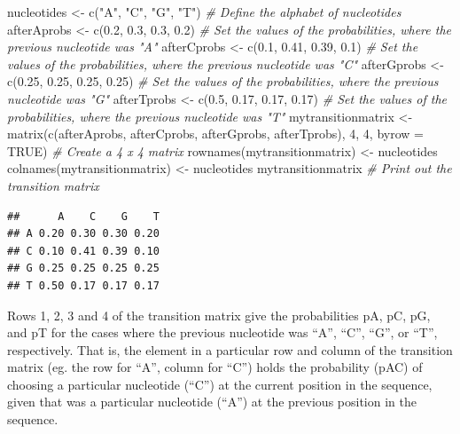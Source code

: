 \documentclass[
]{book}
\newenvironment{Shaded}{\begin{snugshade}}{\end{snugshade}}
\newcommand{\AttributeTok}[1]{\textcolor[rgb]{0.77,0.63,0.00}{#1}}
\newcommand{\CommentTok}[1]{\textcolor[rgb]{0.56,0.35,0.01}{\textit{#1}}}
\newcommand{\ConstantTok}[1]{\textcolor[rgb]{0.00,0.00,0.00}{#1}}
\newcommand{\DecValTok}[1]{\textcolor[rgb]{0.00,0.00,0.81}{#1}}
\newcommand{\FloatTok}[1]{\textcolor[rgb]{0.00,0.00,0.81}{#1}}
\newcommand{\FunctionTok}[1]{\textcolor[rgb]{0.00,0.00,0.00}{#1}}
\newcommand{\NormalTok}[1]{#1}
\newcommand{\OtherTok}[1]{\textcolor[rgb]{0.56,0.35,0.01}{#1}}
\newcommand{\StringTok}[1]{\textcolor[rgb]{0.31,0.60,0.02}{#1}}
\begin{document}
\begin{Shaded}
\begin{Highlighting}[]
\NormalTok{nucleotides         }\OtherTok{\textless{}{-}} \FunctionTok{c}\NormalTok{(}\StringTok{"A"}\NormalTok{, }\StringTok{"C"}\NormalTok{, }\StringTok{"G"}\NormalTok{, }\StringTok{"T"}\NormalTok{) }\CommentTok{\# Define the alphabet of nucleotides}
\NormalTok{afterAprobs }\OtherTok{\textless{}{-}} \FunctionTok{c}\NormalTok{(}\FloatTok{0.2}\NormalTok{, }\FloatTok{0.3}\NormalTok{, }\FloatTok{0.3}\NormalTok{, }\FloatTok{0.2}\NormalTok{)         }\CommentTok{\# Set the values of the probabilities, where the previous nucleotide was "A"}
\NormalTok{afterCprobs }\OtherTok{\textless{}{-}} \FunctionTok{c}\NormalTok{(}\FloatTok{0.1}\NormalTok{, }\FloatTok{0.41}\NormalTok{, }\FloatTok{0.39}\NormalTok{, }\FloatTok{0.1}\NormalTok{)       }\CommentTok{\# Set the values of the probabilities, where the previous nucleotide was "C"}
\NormalTok{afterGprobs }\OtherTok{\textless{}{-}} \FunctionTok{c}\NormalTok{(}\FloatTok{0.25}\NormalTok{, }\FloatTok{0.25}\NormalTok{, }\FloatTok{0.25}\NormalTok{, }\FloatTok{0.25}\NormalTok{)     }\CommentTok{\# Set the values of the probabilities, where the previous nucleotide was "G"}
\NormalTok{afterTprobs }\OtherTok{\textless{}{-}} \FunctionTok{c}\NormalTok{(}\FloatTok{0.5}\NormalTok{, }\FloatTok{0.17}\NormalTok{, }\FloatTok{0.17}\NormalTok{, }\FloatTok{0.17}\NormalTok{)      }\CommentTok{\# Set the values of the probabilities, where the previous nucleotide was "T"}
\NormalTok{mytransitionmatrix }\OtherTok{\textless{}{-}} \FunctionTok{matrix}\NormalTok{(}\FunctionTok{c}\NormalTok{(afterAprobs, afterCprobs, afterGprobs, afterTprobs), }\DecValTok{4}\NormalTok{, }\DecValTok{4}\NormalTok{, }\AttributeTok{byrow =} \ConstantTok{TRUE}\NormalTok{) }\CommentTok{\# Create a 4 x 4 matrix}
\FunctionTok{rownames}\NormalTok{(mytransitionmatrix) }\OtherTok{\textless{}{-}}\NormalTok{ nucleotides}
\FunctionTok{colnames}\NormalTok{(mytransitionmatrix) }\OtherTok{\textless{}{-}}\NormalTok{ nucleotides}
\NormalTok{mytransitionmatrix                           }\CommentTok{\# Print out the transition matrix}
\end{Highlighting}
\end{Shaded}

\begin{verbatim}
##      A    C    G    T
## A 0.20 0.30 0.30 0.20
## C 0.10 0.41 0.39 0.10
## G 0.25 0.25 0.25 0.25
## T 0.50 0.17 0.17 0.17
\end{verbatim}

Rows 1, 2, 3 and 4 of the transition matrix give the probabilities pA, pC, pG, and pT for the cases where the previous nucleotide was ``A'', ``C'', ``G'', or ``T'', respectively. That is, the element in a particular row and column of the transition matrix (eg. the row for ``A'', column for ``C'') holds the probability (pAC) of choosing a particular nucleotide (``C'') at the current position in the sequence, given that was a particular nucleotide (``A'') at the previous position in the sequence.
\end{document}
